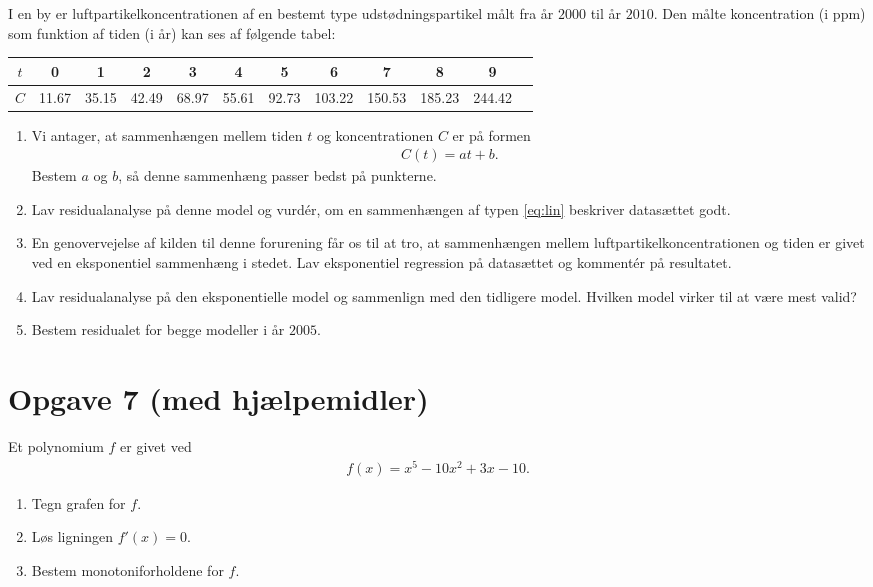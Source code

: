I en by er luftpartikelkoncentrationen af en bestemt type udstødningspartikel målt fra år $2000$ til år $2010$. Den målte koncentration (i ppm) som funktion af tiden (i år) kan ses af følgende tabel:
\begin{center}
\begin{tabular}{c|c|c|c|c|c|c|c|c|c|c|c}
$t$  & 0 & 1 & 2 & 3 & 4 & 5 & 6 & 7 & 8 & 9  \\
\hline
$C$  &11.67 & 35.15 & 42.49 & 68.97 & 55.61 & 92.73 & 103.22 & 150.53 & 185.23 & 244.42
\end{tabular}
\end{center}

\begin{enumerate}[label=\roman*)]
\item Vi antager, at sammenhængen mellem tiden $t$ og koncentrationen $C$ er på formen
\begin{align}\label{eq:lin}
C(t) = at+b.
\end{align}
Bestem $a$ og $b$, så denne sammenhæng passer bedst på punkterne. 
\item Lav residualanalyse på denne model og vurdér, om en sammenhængen af typen \eqref{eq:lin} beskriver datasættet godt.
\item En genovervejelse af kilden til denne forurening får os til at tro, at sammenhængen mellem luftpartikelkoncentrationen og tiden er givet ved en eksponentiel sammenhæng i stedet. Lav eksponentiel regression på datasættet og kommentér på resultatet.
\item Lav residualanalyse på den eksponentielle model og sammenlign med den tidligere model. Hvilken model virker til at være mest valid?
\item Bestem residualet for begge modeller i år $2005$.
\end{enumerate}

\section*{Opgave 7 (med hjælpemidler)}

Et polynomium $f$ er givet ved
\begin{align*}
f(x) = x^5-10x^2+3x-10.
\end{align*}
\begin{enumerate}[label=\roman*)]
\item Tegn grafen for $f$. 
\item Løs ligningen $f'(x) = 0$.
\item Bestem monotoniforholdene for $f$. 
\end{enumerate}


